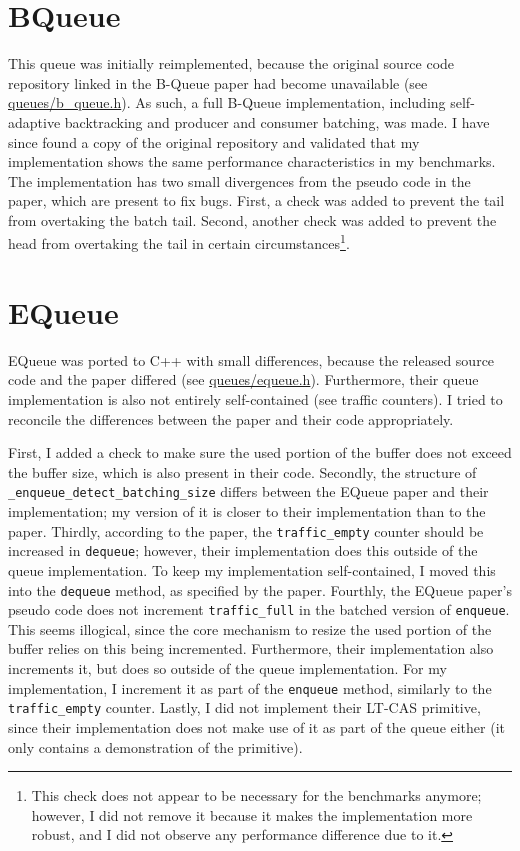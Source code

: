 

\section{BQueue}
This queue was initially reimplemented, because the original source code repository linked in the B-Queue
paper had become unavailable (see
\href{https://github.com/Computerdores/ba/blob/main/src/queues/b_queue.h}{queues/b\_queue.h})\cite{B-Queue}.
As such, a full B-Queue implementation, including self-adaptive backtracking and producer and consumer batching, was made.
I have since found a copy of the original repository and validated that my implementation shows the same
performance characteristics in my benchmarks.
The implementation has two small divergences from the pseudo code in the paper, which are present to fix bugs.
First, a check was added to prevent the tail from overtaking the batch tail.
Second, another check was added to prevent the head from overtaking the tail in certain circumstances\footnote{
    This check does not appear to be necessary for the benchmarks anymore; however, I did not remove it
because it makes the implementation more robust, and I did not observe any performance difference due to it.}.

\section{EQueue}
EQueue was ported to C++ with small differences, because the released source code and the paper differed
(see \href{https://github.com/Computerdores/ba/blob/main/src/queues/equeue.h}{queues/equeue.h})\cite{EQueue}.
Furthermore, their queue implementation is also not entirely self-contained (see traffic counters).
I tried to reconcile the differences between the paper and their code appropriately.

First, I added a check to make sure the used portion of the buffer does not exceed the buffer size, which
is also present in their code.
Secondly, the structure of \texttt{\_enqueue\_detect\_batching\_size} differs between the EQueue paper and
their implementation; my version of it is closer to their implementation than to the paper.
Thirdly, according to the paper, the \texttt{traffic\_empty} counter should be increased in \texttt{dequeue};
however, their implementation does this outside of the queue implementation.
To keep my implementation self-contained, I moved this into the \texttt{dequeue} method, as specified by the paper.
Fourthly, the EQueue paper's pseudo code does not increment \texttt{traffic\_full} in the batched version of
\texttt{enqueue}.
This seems illogical, since the core mechanism to resize the used portion of the
buffer relies on this being incremented.
Furthermore, their implementation also increments it, but does so outside of the queue implementation.
For my implementation, I increment it as part of the \texttt{enqueue} method, similarly to the
\texttt{traffic\_empty} counter.
Lastly, I did not implement their LT-CAS primitive, since their implementation does not make use of it as
part of the queue either (it only contains a demonstration of the primitive).

